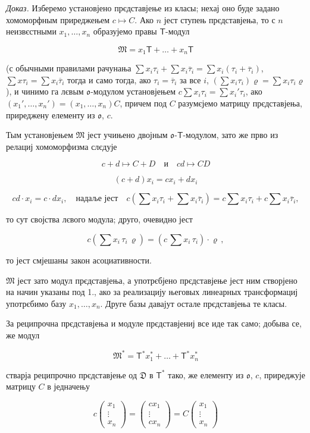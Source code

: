 \documentclass[11pt]{article}
\begin{document}
\emph{Доказ.} Изберемо установјено прєдставјење из класы; нехај оно буде задано хомоморфным приреджењем \(c\mapsto C\). Ако \(n\) јест ступењ прєдставјења, то с \(n\) неизвєстными \(x_1,\ldots,x_n\) образујемо правы \(\mathsf T\)-модул

\[\mathfrak{M} = x_1 \mathsf{T} + \dots + x_n \mathsf{T}\]

(с обычными правилами рачунања \(\sum x_i\tau_i+\sum x_i\overline{\tau}_i=\sum x_i(\tau_i+\overline{\tau}_i)\), \(\sum x\tau_i=\sum x_i\overline{\tau}_i\) тогда и само тогда, ако \(\tau_i=\overline{\tau}_i\) за все \(i\), \((\sum x_i\tau_i)\varrho=\sum x_i\tau_i\varrho\)), и чинимо га лєвым \(\mathfrak{o}\)-модулом установјењем \(c\sum x_i\tau_i=\sum x_i'\tau_i\), ако \((x_1',\ldots,x_n')=(x_1,\ldots,x_n)C\), причем под \(C\) разумєјемо матрицу прєдставјења, приреджену елементу из \(\mathfrak{o}\), \(c\).

Тым установјењем \(\mathfrak M\) јест учињено двојным \(\mathfrak{o}\)-\(\mathsf T\)-модулом, зато же прво из релациј хомоморфизма слєдује

\[
c+d\mapsto C+D \quad \text{и} \quad cd\mapsto CD
\]

\[
(c+d)x_i=cx_i+dx_i
\]

\[
cd\cdot x_i=c\cdot dx_i,\quad\text{надаље јест}\quad
c\left(\sum x_i\tau_i+\sum x_i\overline{\tau}_i\right)
=c\sum x_i\tau_i+c\sum x_i\overline{\tau}_i,
\]

то сут својства лєвого модула; друго, очевидно јест

\[c(\sum x_i \, \tau_i \, \varrho) = (c \, \sum x_i \, \tau_i) \cdot \varrho \,,\]

то јест смјешаны закон асоциативности.

\(\mathfrak{M}\) јест зато модул прєдставјења, а употрєбјено прєдставјење јест ним створјено на начин указаны под 1., ако за реализацију његовых линеарных трансформациј употрєбимо базу \(x_1, \ldots, x_n\). Друге базы давајут остале прєдставјења те класы.

За реципрочна прєдставјења и модуле прєдставјениј все иде так само; добыва се, же модул

\[\mathfrak{M}^* = \mathsf{T}^* x_1^* + \dots + \mathsf{T}^* x_n^*\]

стварја реципрочно прєдставјење од \(\mathfrak D\) в \(\mathsf T^*\) тако, же елементу из \(\mathfrak{o}\), \(c\), приреджује матрицу \(C\) в једначењу

\[
c\begin{pmatrix}x_1\\ \vdots\\ x_n\end{pmatrix}
=\begin{pmatrix}cx_1\\ \vdots\\ cx_n\end{pmatrix}
=C\begin{pmatrix}x_1\\ \vdots\\ x_n\end{pmatrix}
\]
\end{document}
